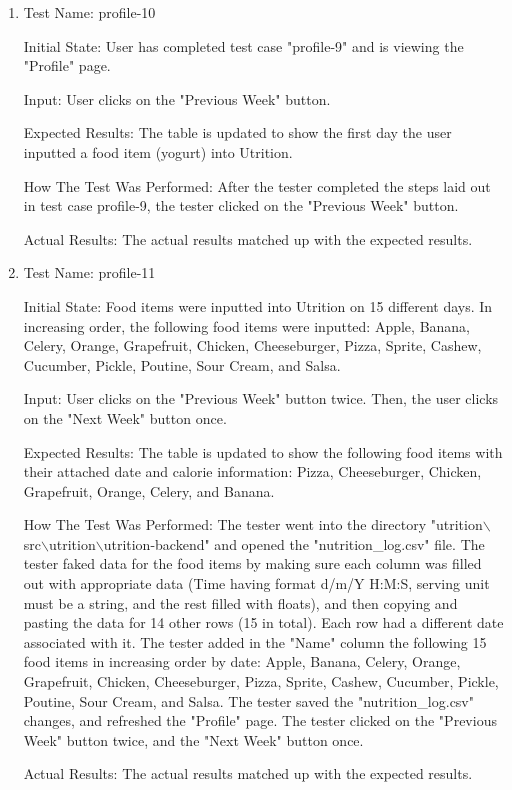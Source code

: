 \documentclass[12pt, titlepage]{article}
\begin{document}
\begin{enumerate}
		\item{Test Name: profile-10}
		
		Initial State: User has completed test case "profile-9" and is viewing the "Profile" page.
		
		Input: User clicks on the "Previous Week" button.
		
		Expected Results: The table is updated to show the first day the user inputted a food item (yogurt) into Utrition.
		
		How The Test Was Performed: After the tester completed the steps laid out in test case profile-9, the tester clicked on the "Previous Week" button.
		
		Actual Results: The actual results matched up with the expected results.
		
		\item{Test Name: profile-11}
		
		Initial State: Food items were inputted into Utrition on 15 different days. In increasing order, the following food items were inputted: Apple, Banana, Celery, Orange, Grapefruit, Chicken, Cheeseburger, Pizza, Sprite, Cashew, Cucumber, Pickle, Poutine, Sour Cream, and Salsa.
		
		Input: User clicks on the "Previous Week" button twice. Then, the user clicks on the "Next Week" button once.
		
		Expected Results: The table is updated to show the following food items with their attached date and calorie information: Pizza, Cheeseburger, Chicken, Grapefruit, Orange, Celery, and Banana.
		
		How The Test Was Performed: The tester went into the directory "utrition$\backslash$src$\backslash$utrition$\backslash$utrition-backend" and opened the "nutrition\_log.csv" file. The tester faked data for the food items by making sure each column was filled out with appropriate data (Time having format d/m/Y H:M:S, serving unit must be a string, and the rest filled with floats), and then copying and pasting the data for 14 other rows (15 in total). Each row had a different date associated with it. The tester added in the "Name" column the following 15 food items in increasing order by date: Apple, Banana, Celery, Orange, Grapefruit, Chicken, Cheeseburger, Pizza, Sprite, Cashew, Cucumber, Pickle, Poutine, Sour Cream, and Salsa. The tester saved the "nutrition\_log.csv" changes, and refreshed the "Profile" page. The tester clicked on the "Previous Week" button twice, and the "Next Week" button once.
		
		Actual Results: The actual results matched up with the expected results.
		

\end{enumerate}
\end{document}
